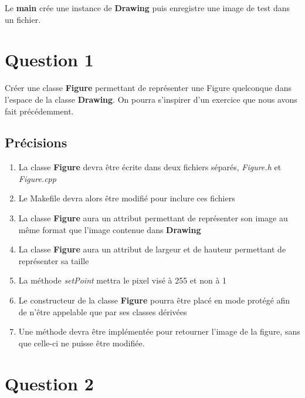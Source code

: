 \documentclass[
	12pt, %
]{fphw}
\begin{document}
Le \textbf{main} crée une instance de \textbf{Drawing} puis enregistre une image de test dans un fichier.



\section*{Question 1}

\begin{problem}
	Créer une classe \textbf{Figure} permettant de représenter une Figure quelconque dans l'espace de la classe \textbf{Drawing}. On pourra s'inspirer d'un exercice que nous avons fait précédemment.
\end{problem}


\subsection*{Précisions}

\begin{enumerate}
	\item La classe \textbf{Figure} devra être écrite dans deux fichiers séparés, \emph{Figure.h} et \emph{Figure.cpp}
	\item Le Makefile devra alors être modifié pour inclure ces fichiers
	\item La classe \textbf{Figure} aura un attribut permettant de représenter son image au même format que l'image contenue dans \textbf{Drawing}
	\item La classe \textbf{Figure} aura un attribut de largeur et de hauteur permettant de représenter sa taille
	\item La méthode \emph{setPoint} mettra le pixel visé à 255 et non à 1
	\item Le constructeur de la classe \textbf{Figure} pourra être placé en mode protégé afin de n'être appelable que par ses classes dérivées
	\item Une méthode devra être implémentée pour retourner l'image de la figure, sans que celle-ci ne puisse être modifiée.
\end{enumerate}


\section*{Question 2}
\end{document}
